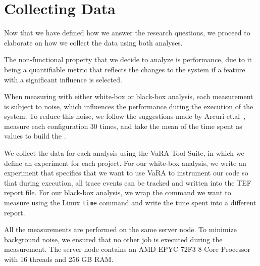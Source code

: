 \section{Collecting Data}\label{ch:collect-data}
Now that we have defined how we answer the research questions, we proceed to elaborate on how we collect the data using both analyses.

The non-functional property that we decide to analyze is performance, due to it being a quantifiable metric
that reflects the changes to the system if a feature with a significant influence is selected.

When measuring with either white-box or black-box analysis, 
each measurement is subject to noise, which influences the performance during the execution of the system. 
To reduce this noise, we follow the suggestions made by Arcuri et.al~\cite{SampleSize}, 
measure each configuration 30 times, and take the mean of the time spent as values to build the {\perfInfluenceModel}.

We collect the data for each analysis using the VaRA Tool Suite, in which we define an experiment for each project. 
For our white-box analysis, we write an experiment that specifies that we want to use VaRA to instrument our code so that during execution, 
all trace events can be tracked and written into the TEF report file. For our black-box analysis, 
we wrap the command we want to measure using the Linux \texttt{time} command and write the time spent into a different report. 

All the measurements are performed on the same server node. To minimize background noise, we ensured that no other job is executed during the measurement. 
The server node contains an AMD EPYC 72F3 8-Core Processor with 16 threads and 256 GB RAM.

